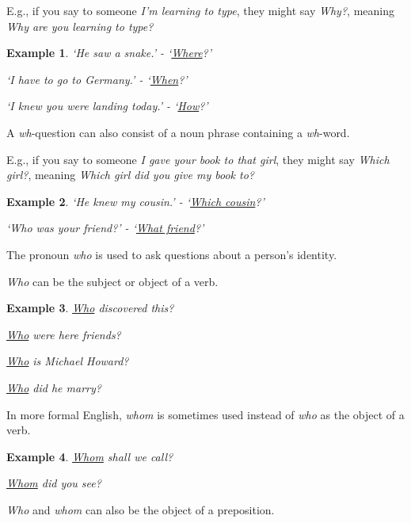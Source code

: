 \documentclass[oneside]{book}
\numberwithin{equation}{section}
\newtheorem{example}{Example}[section]
\begin{document}
%
E.g., if you say to someone \textit{I'm learning to type}, they might say \textit{Why?}, meaning \textit{Why are you learning to type?}
\begin{example}
    `He saw a snake.' - `\underline{Where}?'
    
    `I have to go to Germany.' - `\underline{When}?'
    
    `I knew you were landing today.' - `\underline{How}?'
\end{example}
A \textit{wh}-question can also consist of a noun phrase containing a \textit{wh}-word.

E.g., if you say to someone \textit{I gave your book to that girl}, they might say \textit{Which girl?}, meaning \textit{Which girl did you give my book to?}
\begin{example}
    `He knew my cousin.' - `\underline{Which cousin}?'
    
    `Who was your friend?' - `\underline{What friend}?'
\end{example}
%
\noindent{} The pronoun \textit{who} is used to ask questions about a person's identity.

\textit{Who} can be the subject or object of a verb.
\begin{example}
    \underline{Who} discovered this?
    
    \underline{Who} were here friends?
    
    \underline{Who} is Michael Howard?
    
    \underline{Who} did he marry?
\end{example}
In more formal English, \textit{whom} is sometimes used instead of \textit{who} as the object of a verb.
\begin{example}
    \underline{Whom} shall we call?
    
    \underline{Whom} did you see?
\end{example}
\textit{Who} and \textit{whom} can also be the object of a preposition.
\end{document}
